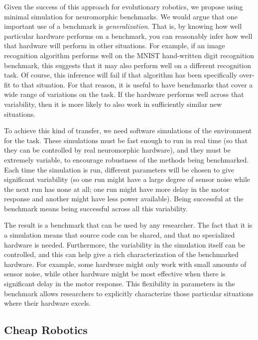 \documentclass{frontiersSCNS} %
\begin{document}
Given the success of this approach for evolutionary robotics, we propose
using minimal simulation for neuromorphic benchmarks.  We would argue that
one important use of a benchmark is \emph{generalization}.  That is, by knowing how well particular
hardware performs on a benchmark, you can reasonably infer how well
that hardware will perform in other situations.  For example, if an image recognition
algorithm performs well on the MNIST hand-written digit recognition
benchmark, this suggests that it may also perform well on
a different recognition task.  Of course, this inference will fail if that
algorithm has been specifically over-fit to that situation.  For
that reason, it is useful to have benchmarks that cover a wide range
of variations on the task.  If the hardware performs well across that
variability, then it is more likely to also work in sufficiently similar new situations.

To achieve this kind of transfer, we need software simulations of the environment for the task.
These simulations
must be fast enough to run in real time (so that they can be controlled by
real neuromorphic hardware), and they must be extremely variable, to encourage
robustness of the methods being benchmarked.  Each time
the simulation is run, different parameters will be chosen to give significant variability
(so one run might have a large degree of sensor noise while the next run has
none at all; one run might have more delay in the motor response and another
might have less power available).  Being successful at the benchmark means
being successful across all this variability.  

The result is a benchmark that can be used by any researcher.  The fact
that it is a simulation means that source code can be shared, and that no
specialized hardware is needed.  Furthermore, the variability in the simulation
itself can be controlled, and this can help give a rich characterization of
the benchmarked hardware.  For example, some hardware might only work with
small amounts of sensor noise, while other hardware might be most effective when there
is significant delay in the motor response.  This flexibility in parameters
in the benchmark allows researchers to explicitly characterize those particular
situations where their hardware excels.  

\subsection{Cheap Robotics}
\end{document}
